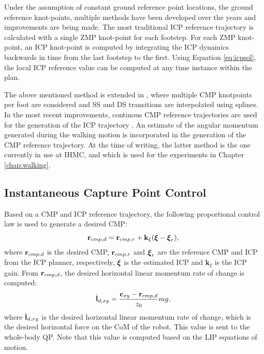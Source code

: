 Under the assumption of constant ground reference point locations, the ground reference knot-points, multiple methods have been developed over the years and improvements are being made. The most traditional \ac{ICP} reference trajectory is calculated with a single \ac{ZMP} knot-point \cite{englsberger2012integration} for each footstep. For each \ac{ZMP} knot-point, an \ac{ICP} knot-point is computed by integrating the \ac{ICP} dynamics backwards in time from the last footstep to the first. Using Equation \eqref{eq:icpsol}, the local \ac{ICP} reference value can be computed at any time instance within the plan. 

The above mentioned method is extended in \cite{englsberger2014trajectory}, where multiple \ac{CMP} knotpoints per foot are considered and \ac{SS} and \ac{DS} transitions are interpolated using splines. In the most recent improvements, continous \ac{CMP} reference trajectories are used for the generation of the \ac{ICP} trajectory \cite{seyde2018inclusion}. An estimate of the angular momentum generated during the walking motion is incorporated in the generation of the \ac{CMP} reference trajectory. At the time of writing, the latter method is the one currently in use at \ac{IHMC}, and which is used for the experiments in Chapter \ref{chap:walking}.
\subsection{Instantaneous Capture Point Control}\label{sec:icpcontrol}
Based on a \ac{CMP} and \ac{ICP} reference trajectory, the following proportional control law is used to generate a desired \ac{CMP}:
\begin{equation}
    \mathbf{r}_{cmp,d}=\mathbf{r}_{cmp,r} + \mathbf{k}_{\xi}(\boldsymbol{\xi}-\boldsymbol{\xi}_r),
    \label{eq:rcmpd}
\end{equation}
where $\mathbf{r}_{cmp,d}$ is the desired \ac{CMP}, $\mathbf{r}_{cmp,r}$ and $\boldsymbol{\xi}_r$ are the reference \ac{CMP} and \ac{ICP} from the \ac{ICP} planner, respectively, $\boldsymbol{\xi}$ is the estimated \ac{ICP} and $\mathbf{k}_{\xi}$ is the \ac{ICP} gain. From $\mathbf{r}_{cmp,d}$, the desired horizontal linear momentum rate of change is computed:
\begin{equation}\label{eq:dotldxy}
    \dot{\mathbf{l}}_{d,xy} = \frac{\mathbf{c}_{xy}-\mathbf{r}_{cmp,d}}{z_0}mg,
\end{equation}
where $\dot{\mathbf{l}}_{d,xy}$ is the desired horizontal linear momentum rate of change, which is the desired horizontal force on the \ac{CoM} of the robot. This value is sent to the whole-body \ac{QP}. Note that this value is computed based on the \ac{LIP} equations of motion. 

